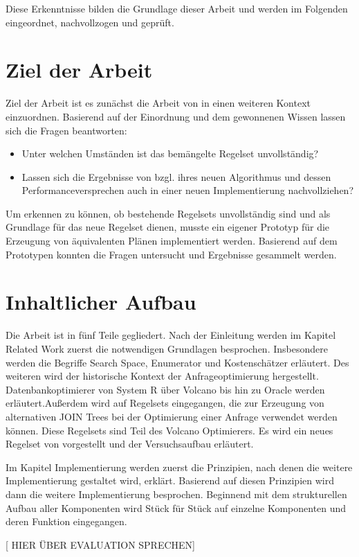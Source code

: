Diese Erkenntnisse bilden die Grundlage dieser Arbeit und werden im Folgenden eingeordnet, nachvollzogen und geprüft.

\section{Ziel der Arbeit}

Ziel der Arbeit ist es zunächst die Arbeit von \cite{shanbhag2014optimizing} in einen weiteren Kontext einzuordnen. Basierend auf der Einordnung und dem gewonnenen Wissen lassen sich die Fragen beantworten:

\begin{itemize}
\item Unter welchen Umständen ist das bemängelte Regelset unvollständig? 
\item Lassen sich die Ergebnisse von \cite{shanbhag2014optimizing} bzgl. ihres neuen Algorithmus und dessen Performanceversprechen auch in einer neuen Implementierung nachvollziehen?
\end{itemize}

Um erkennen zu können, ob bestehende Regelsets unvollständig sind und als Grundlage für das neue Regelset dienen,  musste ein eigener Prototyp für die Erzeugung von äquivalenten Plänen implementiert werden. Basierend auf dem Prototypen konnten die Fragen untersucht und Ergebnisse gesammelt werden.







\section{Inhaltlicher Aufbau}
Die Arbeit ist in fünf Teile gegliedert. Nach der Einleitung werden im Kapitel Related Work zuerst die notwendigen Grundlagen besprochen. Insbesondere werden die Begriffe Search Space, Enumerator und Kostenschätzer erläutert. Des weiteren wird der historische Kontext der Anfrageoptimierung hergestellt. Datenbankoptimierer von System R über Volcano bis hin zu Oracle werden erläutert.Außerdem wird auf Regelsets eingegangen, die zur Erzeugung von alternativen JOIN Trees bei der Optimierung einer Anfrage verwendet werden können. Diese Regelsets sind Teil des Volcano Optimierers. Es wird ein neues Regelset von \cite{shanbhag2014optimizing} vorgestellt und der Versuchsaufbau erläutert. 

Im Kapitel Implementierung werden zuerst die Prinzipien,  nach denen die weitere Implementierung gestaltet wird, erklärt. Basierend auf diesen Prinzipien wird dann die weitere Implementierung besprochen. Beginnend mit dem strukturellen Aufbau aller Komponenten wird Stück für Stück auf einzelne Komponenten und deren Funktion eingegangen.

[ HIER ÜBER EVALUATION SPRECHEN]



 